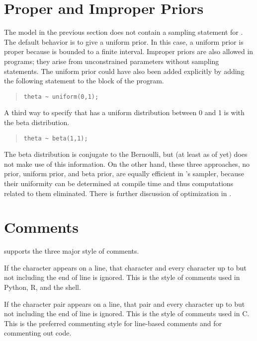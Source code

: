 \section{Proper and Improper Priors}

The model in the previous section does not contain a sampling
statement for .  The default behavior is to give
 a uniform prior.  In this case, a uniform prior is proper
because  is bounded to a finite interval.  Improper priors
are also allowed in \Stan programs; they arise from unconstrained
parameters without sampling statements.  The uniform prior could have
also been added explicitly by adding the following statement to the
 block of the program.
%
\begin{quote}
\begin{Verbatim} 
theta ~ uniform(0,1);
\end{Verbatim}
\end{quote}
% 
A third way to specify that  has a uniform distribution
between 0 and 1 is with the beta distribution.
%
\begin{quote}
\begin{Verbatim}
theta ~ beta(1,1);
\end{Verbatim}
\end{quote}
%
The beta distribution is conjugate to the Bernoulli, but \Stan (at
least as of yet) does not make use of this information.  On the other hand,
these three approaches, no prior, uniform prior, and beta prior,
are equally efficient in \Stan's sampler, because their uniformity
can be determined at compile time and thus computations related to
them eliminated.  There is further discussion of \Stan optimization
in .

\section{Comments}

\Stan supports the three major style of comments.  

If the character \code{\#} appears on a line, that character and every
character up to but not including the end of line is ignored.  This is
the style of comments used in Python, R, and the shell.  

If the character pair \code{//} appears on a line, that pair and every
character up to but not including the end of line is ignored.  This is
the style of comments used in C.  This is the preferred commenting
style for line-based comments and for commenting out code.

